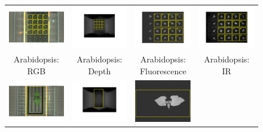 \begin{figure}
\begin{centering}
\begin{tabular}{@{}c c c c}
\includegraphics[width=.23\textwidth]{Figures/FourModalities/A_rgb}&
\includegraphics[width=.23\textwidth]{Figures/FourModalities/A_depth}&
\includegraphics[width=.23\textwidth]{Figures/FourModalities/A_fmp}&
\includegraphics[width=.23\textwidth]{Figures/FourModalities/A_ir}\\
Arabidopsis: RGB & Arabidopsis: Depth & Arabidopsis: Fluorescence & Arabidopsis: IR \\
\includegraphics[width=.23\textwidth]{Figures/FourModalities/B_rgb}&
\includegraphics[width=.23\textwidth]{Figures/FourModalities/B_depth}&
\includegraphics[width=.23\textwidth]{Figures/FourModalities/B_fmp}&

\end{tabular}
\end{centering}
\end{figure}
